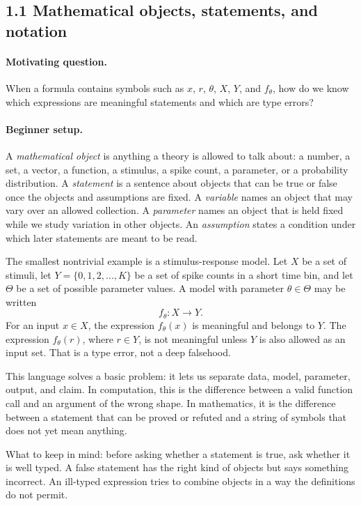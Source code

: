 \subsection{1.1 Mathematical objects, statements, and notation}

\paragraph{Motivating question.}
When a formula contains symbols such as \(x\), \(r\), \(\theta\), \(X\), \(Y\), and \(f_\theta\), how do we know which expressions are meaningful statements and which are type errors?

\paragraph{Beginner setup.}
A \emph{mathematical object} is anything a theory is allowed to talk about: a number, a set, a vector, a function, a stimulus, a spike count, a parameter, or a probability distribution. A \emph{statement} is a sentence about objects that can be true or false once the objects and assumptions are fixed. A \emph{variable} names an object that may vary over an allowed collection. A \emph{parameter} names an object that is held fixed while we study variation in other objects. An \emph{assumption} states a condition under which later statements are meant to be read.

The smallest nontrivial example is a stimulus-response model. Let \(X\) be a set of stimuli, let \(Y=\{0,1,2,\ldots,K\}\) be a set of spike counts in a short time bin, and let \(\Theta\) be a set of possible parameter values. A model with parameter \(\theta\in\Theta\) may be written
\[
f_\theta:X\to Y.
\]
For an input \(x\in X\), the expression \(f_\theta(x)\) is meaningful and belongs to \(Y\). The expression \(f_\theta(r)\), where \(r\in Y\), is not meaningful unless \(Y\) is also allowed as an input set. That is a type error, not a deep falsehood.

This language solves a basic problem: it lets us separate data, model, parameter, output, and claim. In computation, this is the difference between a valid function call and an argument of the wrong shape. In mathematics, it is the difference between a statement that can be proved or refuted and a string of symbols that does not yet mean anything.

What to keep in mind: before asking whether a statement is true, ask whether it is well typed. A false statement has the right kind of objects but says something incorrect. An ill-typed expression tries to combine objects in a way the definitions do not permit.


